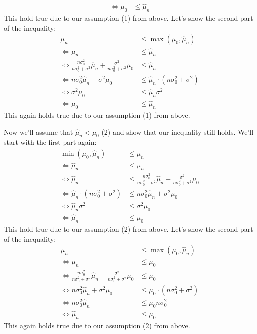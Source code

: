 \documentclass[10pt,a4paper]{article}
\begin{document}
\begin{enumerate}[(a)]
\begin{align*}
    \Leftrightarrow \mu_0 &\le \hat{\mu}_n
\end{align*}
This hold true due to our assumption (1) from above. Let's show the second part of the inequality:
\begin{align*}
    \mu_n &\le \max{(\mu_0,\hat{\mu}_n)}\\
    \Leftrightarrow \mu_n &\le \hat{\mu}_n\\
    \Leftrightarrow \frac{n\sigma_{0}^2}{n\sigma_{0}^2+\sigma^2}\hat{\mu}_n+\frac{\sigma^2}{n\sigma_{0}^2+\sigma^2}\mu_0 &\le \hat{\mu}_n\\
    \Leftrightarrow n\sigma_{0}^2\hat{\mu}_n+\sigma^2\mu_0 &\le \hat{\mu}_n \cdot (n\sigma_{0}^2+\sigma^2)\\
    \Leftrightarrow \sigma^2\mu_0 &\le \hat{\mu}_n\sigma^2\\
    \Leftrightarrow \mu_0 &\le \hat{\mu}_n
\end{align*}
This again holds true due to our assumption (1) from above.

Now we'll assume that $\hat{\mu}_n < \mu_0$ (2) and show that our inequality still holds. We'll start with the first part again:
\begin{align*}
    \min{(\mu_0,\hat{\mu}_n)} &\le \mu_n \\
    \Leftrightarrow \hat{\mu}_n &\le \mu_n\\
    \Leftrightarrow \hat{\mu}_n &\le \frac{n\sigma_{0}^2}{n\sigma_{0}^2+\sigma^2}\hat{\mu}_n+\frac{\sigma^2}{n\sigma_{0}^2+\sigma^2}\mu_0\\
    \Leftrightarrow \hat{\mu}_n \cdot (n\sigma_{0}^2+\sigma^2) &\le n\sigma_{0}^2\hat{\mu}_n + \sigma^2\mu_0\\
    \Leftrightarrow \hat{\mu}_n \sigma^2 &\le \sigma^2\mu_0\\   
    \Leftrightarrow \hat{\mu}_n &\le \mu_0
\end{align*}
This hold true due to our assumption (2) from above. Let's show the second part of the inequality:
\begin{align*}
    \mu_n &\le \max{(\mu_0,\hat{\mu}_n)}\\
    \Leftrightarrow \mu_n &\le \mu_0\\
    \Leftrightarrow \frac{n\sigma_{0}^2}{n\sigma_{0}^2+\sigma^2}\hat{\mu}_n+\frac{\sigma^2}{n\sigma_{0}^2+\sigma^2}\mu_0 &\le \mu_0\\
     \Leftrightarrow n\sigma_{0}^2\hat{\mu}_n+\sigma^2\mu_0 &\le \mu_0 \cdot (n\sigma_{0}^2+\sigma^2)\\
     \Leftrightarrow n\sigma_{0}^2\hat{\mu}_n &\le \mu_0n\sigma_{0}^2\\
     \Leftrightarrow \hat{\mu}_n &\le \mu_0
\end{align*}
This again holds true due to our assumption (2) from above.
\end{enumerate}
\end{document}
